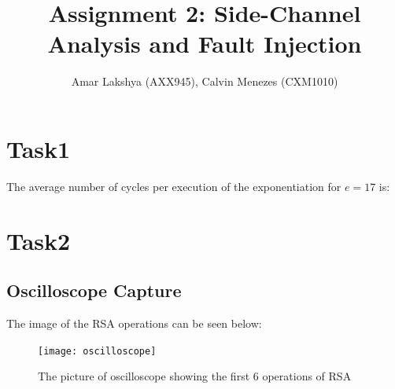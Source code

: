 \documentclass[1p,16pt]{elsarticle}
\begin{document}
\begin{frontmatter}



\title{Assignment 2: Side-Channel Analysis and Fault Injection}


\author{Amar Lakshya (AXX945), Calvin Menezes (CXM1010)}

\address{School of Computer Science, University of Birmingham}

%
%
%
%
\end{frontmatter}


\section{Task1}
\label{Task1}
The average number of cycles per execution of the exponentiation
for $\textit{e}=17$ is:

\section{Task2}
\label{Task2}
\subsection{Oscilloscope Capture}%
\label{sub:oscilloscope_capture}
The image of the RSA operations can be seen below:
\begin{figure}[H]
	\centering
    \centerline{\texttt{[image: oscilloscope]}}
    \caption{The picture of oscilloscope showing the first 6 operations of RSA}\label{fig:oscilloscope}
\end{figure}
\end{document}
